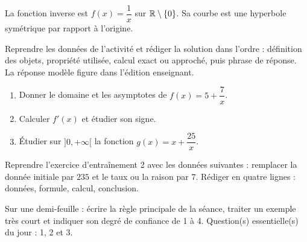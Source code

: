 \begin{traceecrite}La fonction inverse est $f(x)=\dfrac1x$ sur $\mathbb{R}\setminus\{0\}$. Sa courbe est une hyperbole symétrique par rapport à l'origine.\end{traceecrite}

\begin{exemple}
Reprendre les données de l'activité et rédiger la solution dans l'ordre : définition des objets, propriété utilisée, calcul exact ou approché, puis phrase de réponse. La réponse modèle figure dans l'édition enseignant.
\end{exemple}

\begin{exercice}[-- essentiel]
\begin{enumerate}\item Donner le domaine et les asymptotes de $f(x)=5+\dfrac{7}x$.\item Calculer $f'(x)$ et étudier son signe.\item Étudier sur $]0,+\infty[$ la fonction $g(x)=x+\dfrac{25}x$.\end{enumerate}
\end{exercice}


\begin{dm}Reprendre l'exercice d'entraînement 2 avec les données suivantes : remplacer la donnée initiale par $235$ et le taux ou la raison par $7$. Rédiger en quatre lignes : données, formule, calcul, conclusion.\end{dm}

\begin{sortie}Sur une demi-feuille : écrire la règle principale de la séance, traiter un exemple très court et indiquer son degré de confiance de 1 à 4. Question(s) essentielle(s) du jour : 1, 2 et 3.\end{sortie}

